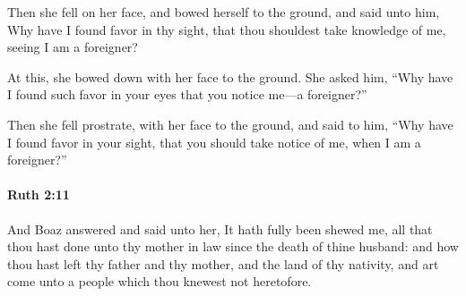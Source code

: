 			\begin{versebox}
					\item[BHS] 
					\item[LXX] 
					\item[ASV] Then she fell on her face, and bowed herself to the ground, and said unto him, Why have I found favor in thy sight, that thou shouldest take knowledge of me, seeing I am a foreigner?
					\item[NIV] At this, she bowed down with her face to the ground. She asked him, “Why have I found such favor in your eyes that you notice me—a foreigner?”
					\item[NRSV] Then she fell prostrate, with her face to the ground, and said to him, “Why have I found favor in your sight, that you should take notice of me, when I am a foreigner?”
			\end{versebox}

		\paragraph{Ruth 2:11} %
			\label{RUTH-2-11}

			And Boaz answered and said unto her, It hath fully been shewed me, all that thou hast done unto thy mother in law since the death of thine husband: and how thou hast left thy father and thy mother, and the land of thy nativity, and art come unto a people which thou knewest not heretofore.

